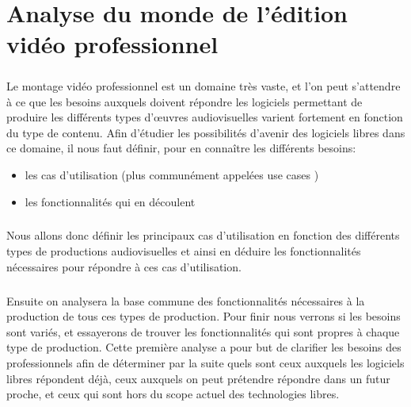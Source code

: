 \chapter {Analyse du monde de l'édition vidéo professionnel}
\minitoc \mtcskip \newpage


\paragraph{}

Le montage vidéo professionnel est un domaine très vaste, et l'on peut
s'attendre à ce que les besoins auxquels doivent répondre les logiciels
permettant de produire les différents types d'œuvres audiovisuelles
varient fortement en fonction du type de contenu. Afin d'étudier
les possibilités d'avenir des logiciels libres dans ce domaine, il nous faut
définir, pour en connaître les différents besoins:

\begin{itemize} \setlength{\itemsep}{2mm}

  \item {les cas d'utilisation (plus communément appelées use cases )}

  \item {les fonctionnalités qui en découlent}

\end{itemize}


\paragraph{}

Nous allons donc définir les principaux cas d'utilisation en fonction des
différents types de productions audiovisuelles et ainsi en déduire les fonctionnalités
nécessaires pour répondre à ces cas d'utilisation.

\paragraph{}

Ensuite on analysera la base commune des fonctionnalités nécessaires à la
production de tous ces types de production.  Pour finir
nous verrons si les besoins sont variés, et essayerons de trouver les
fonctionnalités qui sont propres à chaque type de production. Cette première
analyse a pour but de clarifier les besoins des professionnels afin de
déterminer par la suite quels sont ceux auxquels les logiciels libres répondent déjà,
ceux auxquels on peut prétendre répondre dans un futur proche, et ceux qui
sont hors du scope actuel des technologies libres.

